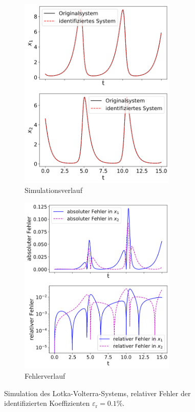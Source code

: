 \begin{figure}[h] %
	\centering
	\begin{subfigure}{.5\textwidth}
	  \centering
	  \includegraphics[width=75mm]{images/sim_volterra_e_0_001_sim.png}
	  \caption{Simulationsverlauf}
	  \label{fig:sim_volterra_e_0.001_sim}
	\end{subfigure}%
	\begin{subfigure}{.5\textwidth}
	  \centering
	  \includegraphics[width=75mm]{images/sim_volterra_e_0_001_err.png}
	  \caption{Fehlerverlauf}
	  \label{fig:sim_volterra_e_0.001_err}
	\end{subfigure}
	\caption{Simulation des Lotka-Volterra-Systems, relativer Fehler der identifizierten Koeffizienten $\varepsilon_\text{r} = 0.1 \%.  $ }
	\label{fig:sim_volterra_e_0.001}
\end{figure}

